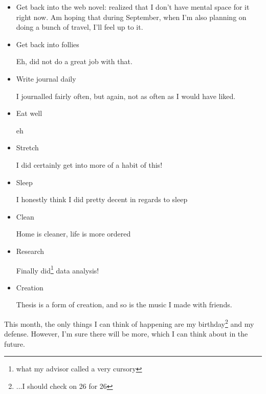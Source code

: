 \documentclass[12pt]{article}
\renewcommand{\,}{\textsuperscript{,}}
\begin{document}
\begin{itemize}

\item Get back into the web novel: realized that I don't have mental space for it right now. Am hoping that during September, when I'm also planning on doing a bunch of travel, I'll feel up to it.  
\item Get back into follies

Eh, did not do a great job with that.

\item Write journal daily

I journalled fairly often, but again, not as often as I would have liked.

\item Eat well

eh

\item Stretch

I did certainly get into more of a habit of this!

\item Sleep

I honestly think I did pretty decent in regards to sleep  
\item Clean

Home is cleaner, life is more ordered

\item Research

Finally did\footnote{what my advisor called a very cursory} data analysis!

\item Creation

Thesis is a form of creation, and so is the music I made with friends.

\end{itemize}

This month, the only things I can think of happening are my birthday\footnote{...I should check on 26 for 26} and my defense.  
However, I'm sure there will be more, which I can think about in the future.
\end{document}
